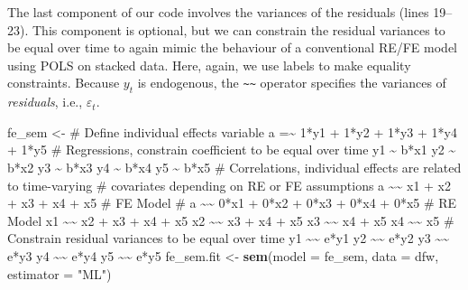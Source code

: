 \documentclass[]{interact}
\theoremstyle{plain}%
\theoremstyle{definition}
\theoremstyle{remark}
\newenvironment{Shaded}{\begin{snugshade}}{\end{snugshade}}
\newcommand{\DataTypeTok}[1]{\textcolor[rgb]{0.13,0.29,0.53}{#1}}
\newcommand{\KeywordTok}[1]{\textcolor[rgb]{0.13,0.29,0.53}{\textbf{#1}}}
\newcommand{\NormalTok}[1]{#1}
\newcommand{\StringTok}[1]{\textcolor[rgb]{0.31,0.60,0.02}{#1}}
\begin{document}
The last component of our code involves the variances of the residuals
(lines 19--23). This component is optional, but we can constrain the
residual variances to be equal over time to again mimic the behaviour of
a conventional RE/FE model using POLS on stacked data. Here, again, we
use labels to make equality constraints. Because \(y_{t}\) is
endogenous, the \texttt{\textasciitilde{}\textasciitilde{}} operator
specifies the variances of \emph{residuals}, i.e., \(\varepsilon_{t}\).

\singlespacing

\doublespacing

\singlespacing

\begin{Shaded}
\begin{Highlighting}[numbers=left,,]
\NormalTok{fe\_sem \textless{}{-}}\StringTok{ \textquotesingle{}}
\StringTok{\# Define individual effects variable }
\StringTok{a =\textasciitilde{} 1*y1 + 1*y2 + 1*y3 + 1*y4 + 1*y5}
\StringTok{\# Regressions, constrain coefficient to be equal over time}
\StringTok{y1 \textasciitilde{} b*x1}
\StringTok{y2 \textasciitilde{} b*x2 }
\StringTok{y3 \textasciitilde{} b*x3}
\StringTok{y4 \textasciitilde{} b*x4}
\StringTok{y5 \textasciitilde{} b*x5}
\StringTok{\# Correlations, individual effects are related to time{-}varying }
\StringTok{\# covariates depending on RE or FE assumptions }
\StringTok{a \textasciitilde{}\textasciitilde{} x1 + x2 + x3 + x4 + x5             \# FE Model }
\StringTok{\# a \textasciitilde{}\textasciitilde{} 0*x1 + 0*x2 + 0*x3 + 0*x4 + 0*x5 \# RE Model }
\StringTok{x1 \textasciitilde{}\textasciitilde{} x2 + x3 + x4 + x5}
\StringTok{x2 \textasciitilde{}\textasciitilde{} x3 + x4 + x5}
\StringTok{x3 \textasciitilde{}\textasciitilde{} x4 + x5}
\StringTok{x4 \textasciitilde{}\textasciitilde{} x5}
\StringTok{\# Constrain residual variances to be equal over time}
\StringTok{y1 \textasciitilde{}\textasciitilde{} e*y1}
\StringTok{y2 \textasciitilde{}\textasciitilde{} e*y2}
\StringTok{y3 \textasciitilde{}\textasciitilde{} e*y3}
\StringTok{y4 \textasciitilde{}\textasciitilde{} e*y4}
\StringTok{y5 \textasciitilde{}\textasciitilde{} e*y5}
\StringTok{\textquotesingle{}}
\NormalTok{fe\_sem.fit \textless{}{-}}\StringTok{ }\KeywordTok{sem}\NormalTok{(}\DataTypeTok{model =}\NormalTok{ fe\_sem, }
                  \DataTypeTok{data =}\NormalTok{ dfw, }
                  \DataTypeTok{estimator =} \StringTok{"ML"}\NormalTok{)}
\end{Highlighting}
\end{Shaded}
\end{document}
